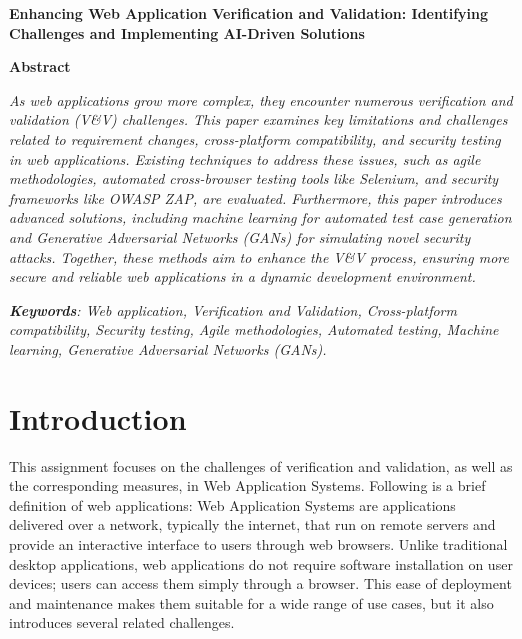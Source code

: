 \documentclass[a4paper, 11pt]{article}  %
\begin{document}
\tableofcontents
\newpage  %

\setcounter{page}{1} %




\begin{center}
    \fontsize{14}{16}\selectfont %
    \textbf{Enhancing Web Application Verification and Validation: Identifying Challenges and Implementing AI-Driven Solutions}
\end{center}

\vspace{0.25cm}

\begin{center}
    \fontsize{12}{14}\selectfont
    \textbf{Abstract}
\end{center}
\noindent
\textit{As web applications grow more complex, they encounter numerous verification and validation (V\&V) challenges. This paper examines key limitations and challenges related to requirement changes, cross-platform compatibility, and security testing in web applications. Existing techniques to address these issues, such as agile methodologies, automated cross-browser testing tools like Selenium, and security frameworks like OWASP ZAP, are evaluated. Furthermore, this paper introduces advanced solutions, including machine learning for automated test case generation and Generative Adversarial Networks (GANs) for simulating novel security attacks. Together, these methods aim to enhance the V\&V process, ensuring more secure and reliable web applications in a dynamic development environment.}

\vspace{0.25cm} %
\textit{\textbf{Keywords}: Web application, Verification and Validation, Cross-platform compatibility, Security testing, Agile methodologies, Automated testing, Machine learning, Generative Adversarial Networks (GANs).}

\vspace{0.25cm} %

\section{Introduction}
This assignment focuses on the challenges of verification and validation, as well as the corresponding measures, in Web Application Systems. Following is a brief definition of web applications: Web Application Systems are applications delivered over a network, typically the internet, that run on remote servers and provide an interactive interface to users through web browsers. Unlike traditional desktop applications, web applications do not require software installation on user devices; users can access them simply through a browser. This ease of deployment and maintenance makes them suitable for a wide range of use cases, but it also introduces several related challenges.
\end{document}

